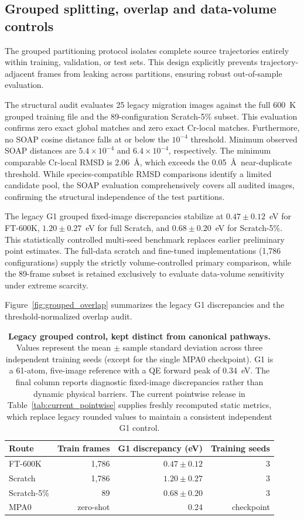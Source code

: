 \documentclass[pdflatex,sn-mathphys-num]{sn-jnl}
\begin{document}
\subsection{Grouped splitting, overlap and data-volume controls}\label{sec:overlap}
The grouped partitioning protocol isolates complete source trajectories entirely within training, validation, or test sets. This design explicitly prevents trajectory-adjacent frames from leaking across partitions, ensuring robust out-of-sample evaluation.

The structural audit evaluates 25 legacy migration images against the full 600~K grouped training file and the 89-configuration Scratch-5\% subset. This evaluation confirms zero exact global matches and zero exact Cr-local matches. Furthermore, no SOAP cosine distance falls at or below the $10^{-4}$ threshold. Minimum observed SOAP distances are $5.4\times10^{-4}$ and $6.4\times10^{-4}$, respectively. The minimum comparable Cr-local RMSD is 2.06~\AA, which exceeds the 0.05~\AA\ near-duplicate threshold. While species-compatible RMSD comparisons identify a limited candidate pool, the SOAP evaluation comprehensively covers all audited images, confirming the structural independence of the test partitions.

The legacy G1 grouped fixed-image discrepancies stabilize at $0.47\pm0.12$~eV for FT-600K, $1.20\pm0.27$~eV for full Scratch, and $0.68\pm0.20$~eV for Scratch-5\%. This statistically controlled multi-seed benchmark replaces earlier preliminary point estimates. The full-data scratch and fine-tuned implementations (1,786 configurations) supply the strictly volume-controlled primary comparison, while the 89-frame subset is retained exclusively to evaluate data-volume sensitivity under extreme scarcity.

Figure~\ref{fig:grouped_overlap} summarizes the legacy G1 discrepancies and the threshold-normalized overlap audit.

\begin{table}[htbp]
\centering\small
\caption{\textbf{Legacy grouped control, kept distinct from canonical pathways.} Values represent the mean $\pm$ sample standard deviation across three independent training seeds (except for the single MPA0 checkpoint). G1 is a 61-atom, five-image reference with a QE forward peak of 0.34~eV. The final column reports diagnostic fixed-image discrepancies rather than dynamic physical barriers. The current pointwise release in Table~\ref{tab:current_pointwise} supplies freshly recomputed static metrics, which replace legacy rounded values to maintain a consistent independent G1 control.}
\label{tab:a2_grouped_audit_summary}
\begin{tabular}{lrrr}
\toprule
Route & Train frames & G1 discrepancy (eV) & Training seeds\\
\midrule
FT-600K & 1,786 & $0.47\pm0.12$ & 3\\
Scratch & 1,786 & $1.20\pm0.27$ & 3\\
Scratch-5\% & 89 & $0.68\pm0.20$ & 3\\
MPA0 & zero-shot & 0.24 & checkpoint\\
\bottomrule
\end{tabular}
\end{table}
\end{document}
